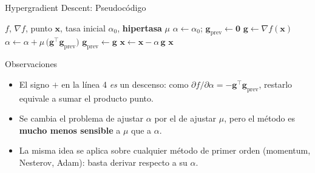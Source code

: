 \begin{frame}{Hypergradient Descent: Pseudocódigo}
    \scriptsize
    \begin{algorithmic}[1]
        \Require $f$, $\nabla f$, punto $\mathbf{x}$, tasa inicial $\alpha_0$,
                 \textbf{hipertasa} $\mu$
        \State $\alpha \gets \alpha_0$; \quad
               $\mathbf{g}_{\text{prev}} \gets \mathbf{0}$
            \State $\mathbf{g} \gets \nabla f(\mathbf{x})$
            \State $\alpha \gets \alpha + \mu\,
                   \big(\mathbf{g}^{\top}\mathbf{g}_{\text{prev}}\big)$
            \State $\mathbf{g}_{\text{prev}} \gets \mathbf{g}$
            \State $\mathbf{x} \gets \mathbf{x} - \alpha\,\mathbf{g}$
        \EndFor
        \State \Return $\mathbf{x}$
    \end{algorithmic}

    \vspace{0.5em}
    \begin{block}{Observaciones}
        \tiny
        \begin{itemize}
            \item El signo $+$ en la línea 4 \emph{es} un descenso: como
                  $\partial f/\partial\alpha = -\mathbf{g}^{\top}\mathbf{g}_{\text{prev}}$,
                  restarlo equivale a sumar el producto punto.
            \item Se cambia el problema de ajustar $\alpha$ por el de ajustar $\mu$,
                  pero el método es \textbf{mucho menos sensible} a $\mu$ que a $\alpha$.
            \item La misma idea se aplica sobre cualquier método de primer orden
                  (momentum, Nesterov, Adam): basta derivar respecto a su $\alpha$.
        \end{itemize}
    \end{block}
\end{frame}

